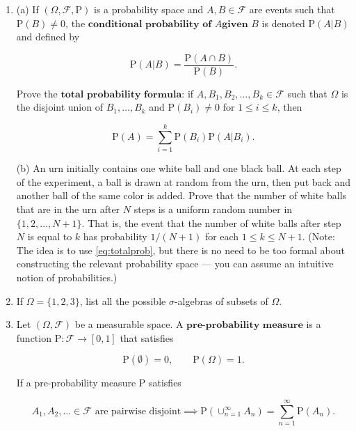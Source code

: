 \documentclass[11pt]{report}
\providecommand{\cal}{\mathcal}
\theoremstyle{plain}
\theoremstyle{definition}
\begin{document}
\begin{enumerate}[label=\arabic*.]
\item (a) If $(\Omega, {\cal F}, \mathrm{P})$ is a
probability space and $A, B\in {\cal F}$ are events
such that $\mathrm{P}(B)\neq 0$, the
$\textbf{conditional probability of } A \textbf{
given } B$
is denoted $\mathrm{P}(A | B)$ and defined by

\[
\mathrm{P}(A | B) = \frac{\mathrm{P}(A \cap B)}{\mathrm{P}(B)}.
\]

\noindent Prove the $\textbf{total probability formula:}$ if
$A,B_1,B_2,\ldots,B_k \in {\cal F}$ such that $\Omega$
is the disjoint union of $B_1,\ldots, B_k$ and
$\mathrm{P}(B_i) \neq 0$ for $1\le i\le k$, then

\begin{equation*}
\tag{21}\label{eq:totalprob}
\mathrm{P}(A) = \sum_{i=1}^k \mathrm{P}(B_i) \mathrm{P}(A | B_i).
\end{equation*}

\noindent (b) An urn initially contains one white ball and one
black ball. At each step of the experiment, a ball is
drawn at random from the urn, then put back and
another ball of the same color is added. Prove that
the number of white balls that are in the urn after
$N$ steps is a uniform random number in
$\{1,2,\ldots,N+1\}$. That is, the event that the
number of white balls after step $N$ is equal to $k$
has probability $1/(N+1)$ for each $1\le k\le N+1$.
(Note: The idea is to use \eqref{eq:totalprob}, but there
is no need to be too formal about constructing the
relevant probability space --- you can assume an
intuitive notion of probabilities.)

\item If $\Omega=\{1,2,3\}$, list all the possible
$\sigma$-algebras of subsets of $\Omega$.

\item Let $(\Omega, {\cal F})$ be a measurable space. A
$\textbf{pre-probability measure}$ is a function
$\mathrm{P}:{\cal F}\to [0,1]$ that satisfies

\begin{equation*}
\tag{22}\label{eq:P1}
\mathrm{P}(\emptyset) = 0, \qquad \mathrm{P}(\Omega) = 1.
\end{equation*}

\noindent If a pre-probability measure $\mathrm{P}$ satisfies

\begin{equation*}
\tag{23}\label{eq:P2}
A_1, A_2, \ldots \in {\cal F}\textrm{ are pairwise disjoint} \implies
\mathrm{P}(\cup_{n=1}^\infty A_n) = \sum_{n=1}^\infty \mathrm{P}(A_n).
\end{equation*}


\end{enumerate}
\end{document}
